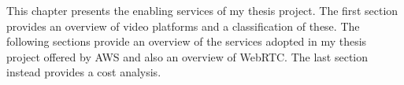 This chapter presents the enabling services of my thesis project. The first section provides an overview of video platforms and a classification of these. The following sections provide an overview of the services adopted in my thesis project offered by AWS and also an overview of WebRTC. The last section instead provides a cost analysis.